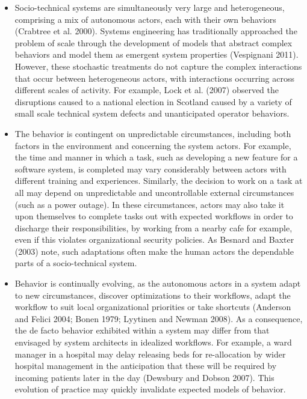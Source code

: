 \documentclass{llncs}
\begin{document}
\begin{itemize}
\item Socio-technical systems are simultaneously very large and heterogeneous, comprising a mix of autonomous
  actors, each with their own behaviors (Crabtree et al. 2000).  Systems engineering has traditionally approached the
  problem of scale through the development of models that abstract complex behaviors and model them as emergent system
  properties (Vespignani 2011).  However, these stochastic treatments do not capture the complex interactions that occur
  between heterogeneous actors, with interactions occurring across different scales of activity.  For example, Lock et
  al. (2007) observed the disruptions caused to a national election in Scotland caused by a variety of small scale
  technical system defects and unanticipated operator behaviors.
\item The behavior is contingent on unpredictable circumstances, including both factors in the environment and
  concerning the system actors.  For example, the time and manner in which a task, such as developing a new feature for
  a software system, is completed may vary considerably between actors with different training and experiences.
  Similarly, the decision to work on a task at all may depend on unpredictable and uncontrollable external circumstances
  (such as a power outage).  In these circumstances, actors may also take it upon themselves to complete tasks out with
  expected workflows in order to discharge their responsibilities, by working from a nearby cafe for example, even if
  this violates organizational security policies.  As Besnard and Baxter (2003) note, such adaptations often make the
  human actors the dependable parts of a socio-technical system.
\item Behavior is continually evolving, as the autonomous actors in a system adapt to new circumstances, discover
  optimizations to their workflows, adapt the workflow to suit local organizational priorities or take shortcuts
  (Anderson and Felici 2004; Bonen 1979; Lyytinen and Newman 2008).  As a consequence, the de facto behavior exhibited
  within a system may differ from that envisaged by system architects in idealized workflows.  For example, a ward
  manager in a hospital may delay releasing beds for re-allocation by wider hospital management in the anticipation that
  these will be required by incoming patients later in the day (Dewsbury and Dobson 2007).  This evolution of practice
  may quickly invalidate expected models of behavior.
\end{itemize}
\end{document}
